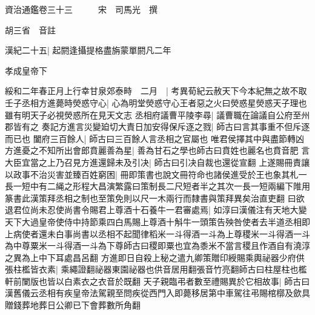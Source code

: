 






























































資治通鑑卷三十三　　　宋　司馬光　撰

胡三省　音註

漢紀二十五|{
	起閼逢攝提格盡旃蒙單閼凡二年}


孝成皇帝下

綏和二年春正月上行幸甘泉郊泰畤　二月　|{
	考異荀紀云赦天下今本紀無之故不取}
壬子丞相方進薨時熒惑守心|{
	心為明堂熒惑守心王者惡之火曰熒惑星熒惑天子理也雖有明天子必視熒惑所在見天文志}
丞相府議曹平陵李尋|{
	議曹職在論議自公府至州郡皆有之}
奏記方進言災變廹切大責日加安得保斥逐之戮|{
	師古曰言其事重不但斥逐而已也}
闔府三百餘人|{
	師古曰三百餘人言丞相之官屬也}
唯君侯擇其中與盡節轉凶方進憂之不知所出會郎賁麗善為星|{
	善為甘石之學也師古曰賁姓也麗名也賁音肥}
言大臣宜當之上乃召見方進還歸未及引决|{
	師古曰引决自裁也還從宣翻}
上遂賜冊責讓以政事不治災害並臻百姓窮困|{
	冊即策書也說文冊符命也諸侯進受於王也象其札一長一短中有二䋲之形程大昌演繁露曰策制長二尺短者半之其次一長一短兩編下陮用篆書此漢策拜丞相之制也至策免則以尺一木兩行而隸書與策拜異矣治直吏翻}
曰欲退君位尚未忍使尚書令賜君上尊酒十石養牛一君審處焉|{
	如淳曰漢儀注有天地大變天下大過皇帝使侍中持節乘四白馬賜上尊酒十斛牛一頭策告殃咎使者去半道丞相即上病使者還未白事尚書以丞相不起聞律稻米一斗得酒一斗為上尊稷米一斗得酒一斗為中尊粟米一斗得酒一斗為下尊師古曰稷即粟也宜為黍米不當言稷且作酒自有澆淳之異為上中下耳處昌呂翻}
方進即日自殺上秘之遣九卿策贈印綬賜乘輿祕器少府供張柱檻皆衣素|{
	乘繩證翻祕器東園祕器也供音居用翻張音竹亮翻師古曰柱屋柱也檻軒前闌版也皆以白素衣之衣音於既翻}
天子親臨弔者數至禮賜異於它相故事|{
	師古曰漢舊儀云丞相有疾皇帝法駕親至問疾從西門入即薨移居第中車駕往弔賜棺槨及歛具贈錢葬地葬日公卿已下會葬數所角翻}


